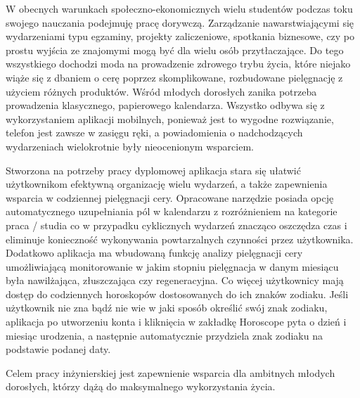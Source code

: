\phantom{Th}
W obecnych warunkach społeczno-ekonomicznych wielu studentów podczas toku swojego nauczania podejmuję pracę dorywczą.
Zarządzanie nawarstwiającymi się wydarzeniami typu egzaminy, projekty zaliczeniowe, spotkania biznesowe,
czy po prostu wyjścia ze znajomymi mogą być dla wielu osób przytłaczające.
Do tego wszystkiego dochodzi moda na prowadzenie zdrowego trybu życia, które niejako wiąże się z dbaniem o cerę poprzez skomplikowane,
rozbudowane pielęgnację z użyciem różnych produktów. Wśród młodych dorosłych zanika potrzeba prowadzenia klasycznego,
papierowego kalendarza. Wszystko odbywa się z wykorzystaniem aplikacji mobilnych, ponieważ jest to wygodne rozwiązanie,
telefon jest zawsze w zasięgu ręki, a powiadomienia o nadchodzących wydarzeniach wielokrotnie były nieocenionym wsparciem.

Stworzona na potrzeby pracy dyplomowej aplikacja stara się ułatwić użytkownikom efektywną organizację wielu wydarzeń,
a także zapewnienia wsparcia w codziennej pielęgnacji cery. Opracowane narzędzie posiada opcję automatycznego uzupełniania pól w kalendarzu
z rozróżnieniem na kategorie praca / studia co w przypadku cyklicznych wydarzeń znacząco oszczędza czas i eliminuje konieczność
wykonywania powtarzalnych czynności przez użytkownika. Dodatkowo aplikacja ma wbudowaną funkcję analizy pielęgnacji cery umożliwiającą
monitorowanie w jakim stopniu pielęgnacja w danym miesiącu była nawilżająca, złuszczająca czy regeneracyjna.
Co więcej użytkownicy mają dostęp do codziennych horoskopów dostosowanych do ich znaków zodiaku.
Jeśli użytkownik nie zna bądź nie wie w jaki sposób określić swój znak zodiaku, aplikacja po utworzeniu konta i kliknięcia w zakładkę Horoscope
pyta o dzień i miesiąc urodzenia, a następnie automatycznie przydziela znak zodiaku na podstawie podanej daty.

Celem pracy inżynierskiej jest zapewnienie wsparcia dla ambitnych młodych dorosłych, którzy dążą do maksymalnego wykorzystania życia.
